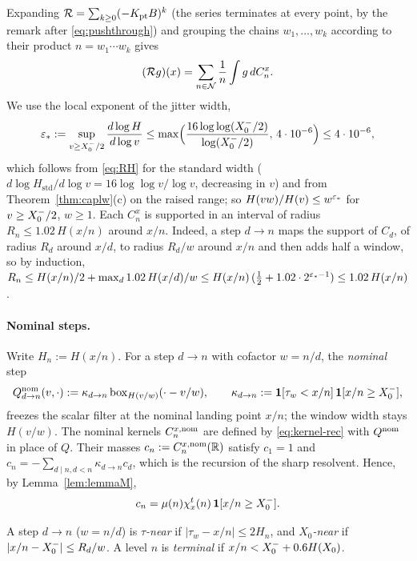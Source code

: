 Expanding $\mathcal{R}=\sum_{k\ge0}(-K_{\mathrm{pt}} B)^k$ (the series terminates at every point, by the remark after
\eqref{eq:pushthrough}) and grouping the chains $w_1,\dots,w_k$ according to their product $n=w_1\cdots w_k$ gives
\begin{equation}\label{eq:R-kernels}
  (\mathcal{R} g)(x)=\sum_{n\in\mathcal{N}}\frac1n\int g\,dC_n^x .
\end{equation}
We use the local exponent of the jitter width,
\[
  \varepsilon_*:=\sup_{v\ge X_0^{-}/2}\frac{d\log H}{d\log v}\le\max\Bigl(\frac{16\log\log(X_0^{-}/2)}{\log(X_0^{-}/2)},\,4\cdot10^{-6}\Bigr)\le4\cdot10^{-6},
\]
which follows from \eqref{eq:RH} for the standard width ($d\log H_{\mathrm{std}}/d\log v=16\log\log v/\log v$, decreasing in $v$)
and from Theorem~\ref{thm:caplw}(c) on the raised range; so $H(vw)/H(v)\le w^{\varepsilon_*}$ for $v\ge X_0^{-}/2$, $w\ge1$.
Each $C_n^x$ is supported in an interval of radius $R_n\le1.02\,H(x/n)$ around $x/n$. Indeed, a step $d\to n$ maps
the support of $C_d$, of radius $R_d$ around $x/d$, to radius $R_d/w$ around $x/n$ and then adds half a window, so by
induction, $R_n\le H(x/n)/2+\max_d 1.02\,H(x/d)/w\le H(x/n)\,(\tfrac12+1.02\cdot2^{\varepsilon_*-1})\le1.02\,H(x/n)$.

\paragraph{Nominal steps.} Write $H_n:=H(x/n)$. For a step $d\to n$ with cofactor $w=n/d$, the \emph{nominal} step
\[
  Q^{\mathrm{nom}}_{d\to n}(v,\cdot):=\kappa_{d\to n}\,\mathrm{box}_{H(v/w)}(\cdot-v/w),\qquad
  \kappa_{d\to n}:=\mathbf 1[\tau_w<x/n]\,\mathbf 1[x/n\ge X_0^{-}],
\]
freezes the scalar filter at the nominal landing point $x/n$; the window width stays $H(v/w)$. The nominal kernels
$C_n^{x,\mathrm{nom}}$ are defined by \eqref{eq:kernel-rec} with $Q^{\mathrm{nom}}$ in place of $Q$. Their masses
$c_n:=C_n^{x,\mathrm{nom}}(\mathbb{R})$ satisfy $c_1=1$ and $c_n=-\sum_{d\mid n,d<n}\kappa_{d\to n}c_d$, which is the recursion of the
sharp resolvent. Hence, by Lemma~\ref{lem:lemmaM},
\begin{equation}\label{eq:nominal-mass}
  c_n=\mu(n)\chi^t_x(n)\,\mathbf 1[x/n\ge X_0^{-}].
\end{equation}

\begin{definition}\label{def:near}
A step $d\to n$ ($w=n/d$) is \emph{$\tau$-near} if $|\tau_w-x/n|\le2H_n$, and \emph{$X_0$-near} if
$|x/n-X_0^{-}|\le R_d/w$. A level $n$ is \emph{terminal} if $x/n<X_0^{-}+0.6H(X_0)$.
\end{definition}

